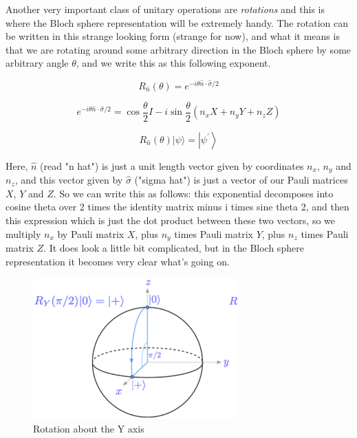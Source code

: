 Another very important class of unitary operations are \emph{rotations} and this is where the Bloch sphere representation will be extremely handy. The rotation can be written in this strange looking form (strange for now), and what it means is that we are rotating around some arbitrary direction in the Bloch sphere by some arbitrary angle $\theta$, and we write this as this following exponent.

\begin{equation}
R_{\hat{n}}(\theta)=e^{-i \theta \hat{n} \cdot \hat{\sigma} / 2}
\end{equation}

\begin{equation}
e^{-i \theta \hat{n} \cdot \hat{\sigma} / 2 }=\cos \frac{\theta}{2} I-i \sin \frac{\theta}{2}\left(n_{x} X+n_{y} Y+n_{z} Z\right)
\end{equation}

\begin{equation}
R_{\hat{n}}(\theta)|\psi\rangle=\left|\psi^{\prime}\right\rangle
\end{equation}

Here, $\hat{n}$ (read "n hat") is just a unit length vector given by coordinates $n_x$, $n_y$ and $n_z$, and this vector given by $\hat{\sigma}$ ("sigma hat") is just a vector of our Pauli matrices $X$, $Y$ and $Z$. So we can write this as follows: this exponential decomposes into cosine theta over 2 times the identity matrix minus i times sine theta 2, and then this expression which is just the dot product between these two vectors, so we multiply $n_x$ by Pauli matrix $X$, plus $n_y$ times Pauli matrix $Y$, plus $n_z$ times Pauli matrix $Z$. It does look a little bit complicated, but in the Bloch sphere representation it becomes very clear what's going on. 


\begin{figure}[H]
    \centering
    \includegraphics[width=0.7\textwidth]{lesson2/bloch_y_axis.pdf}
    
        \caption{Rotation about the Y axis}
    
    \label{fig:y-rot}
\end{figure}

